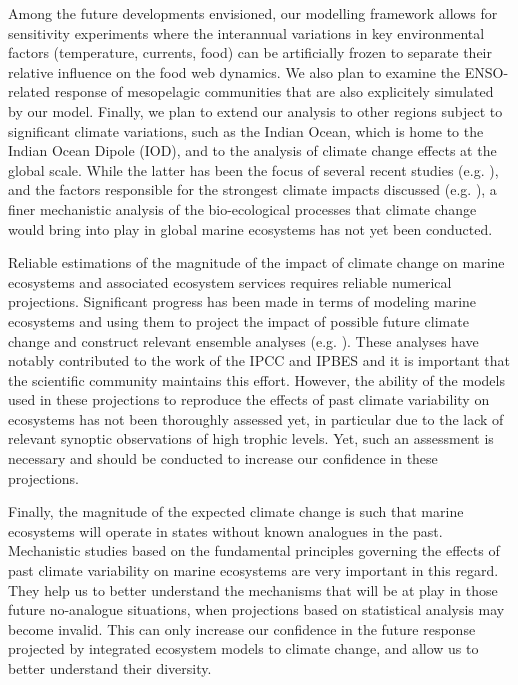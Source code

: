 Among the future developments envisioned, our modelling framework allows for sensitivity experiments where the interannual variations in key environmental factors (temperature, currents, food) can be artificially frozen to separate their relative influence on the food web dynamics. We also plan to examine the ENSO-related response of mesopelagic communities that are also explicitely simulated by our model. Finally, we plan to extend our analysis to other regions subject to significant climate variations, such as the Indian Ocean, which is home to the Indian Ocean Dipole (IOD), and to the analysis of climate change effects at the global scale. While the latter has been the focus of several recent studies (e.g. \citealp{lotzeGlobalEnsembleProjections2019, tittensorNextgenerationEnsembleProjections2021}), and the factors responsible for the strongest climate impacts discussed (e.g. \citealp{heneghanDisentanglingDiverseResponses2021}), a finer mechanistic analysis of the bio-ecological processes that climate change would bring into play in global marine ecosystems has not yet been conducted.

Reliable estimations of the magnitude of the impact of climate change on marine ecosystems and associated ecosystem services requires reliable numerical projections. Significant progress has been made in terms of modeling marine ecosystems and using them to project the impact of possible future climate change and construct relevant ensemble analyses (e.g. \citealp{lotzeGlobalEnsembleProjections2019, tittensorNextgenerationEnsembleProjections2021}). These analyses have notably contributed to the work of the IPCC \citep{portnerIPCCSpecialReport2019, portnerClimateChange20222022} and IPBES \citep{brondizioGlobalAssessmentReport2019} and it is important that the scientific community maintains this effort. However, the ability of the models used in these projections to reproduce the effects of past climate variability on ecosystems has not been thoroughly assessed yet, in particular due to the lack of relevant synoptic observations of high trophic levels. Yet, such an assessment is necessary and should be conducted to increase our confidence in these projections.

Finally, the magnitude of the expected climate change is such that marine ecosystems will operate in states without known analogues in the past. Mechanistic studies based on the fundamental principles governing the effects of past climate variability on marine ecosystems are very important in this regard. They help us to better understand the mechanisms that will be at play in those future no-analogue situations, when projections based on statistical analysis may become invalid. This can only increase our confidence in the future response projected by integrated ecosystem models to climate change, and allow us to better understand their diversity.
